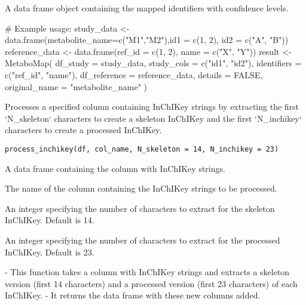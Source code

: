 \documentclass[a4paper]{book}
\begin{document}
%
\begin{Value}
A data frame object containing the mapped identifiers with confidence levels.
\end{Value}
%
\begin{Examples}
\begin{ExampleCode}
# Example usage:
study_data <- data.frame(metabolite_name=c("M1","M2"),id1 = c(1, 2), id2 = c("A", "B"))
reference_data <- data.frame(ref_id = c(1, 2), name = c("X", "Y"))
result <- MetaboMap(
  df_study = study_data,
  study_cols = c("id1", "id2"),
  identifiers = c("ref_id", "name"),
  df_reference = reference_data,
  details = FALSE,
  original_name = "metabolite_name"
)
\end{ExampleCode}
\end{Examples}
%
\begin{Description}
Processes a specified column containing InChIKey strings by extracting
the first `N\_skeleton` characters to create a skeleton InChIKey and the first `N\_inchikey` characters
to create a processed InChIKey.
\end{Description}
%
\begin{Usage}
\begin{verbatim}
process_inchikey(df, col_name, N_skeleton = 14, N_inchikey = 23)
\end{verbatim}
\end{Usage}
%
\begin{Arguments}
\begin{ldescription}
\item[\code{df}] A data frame containing the column with InChIKey strings.

\item[\code{col\_name}] The name of the column containing the InChIKey strings to be processed.

\item[\code{N\_skeleton}] An integer specifying the number of characters to extract for the skeleton InChIKey.
Default is 14.

\item[\code{N\_inchikey}] An integer specifying the number of characters to extract for the processed InChIKey.
Default is 23.
\end{ldescription}
\end{Arguments}
%
\begin{Details}
- This function takes a column with InChIKey strings and extracts a skeleton version (first 14 characters)
and a processed version (first 23 characters) of each InChIKey.
- It returns the data frame with these new columns added.
\end{Details}
\end{document}
